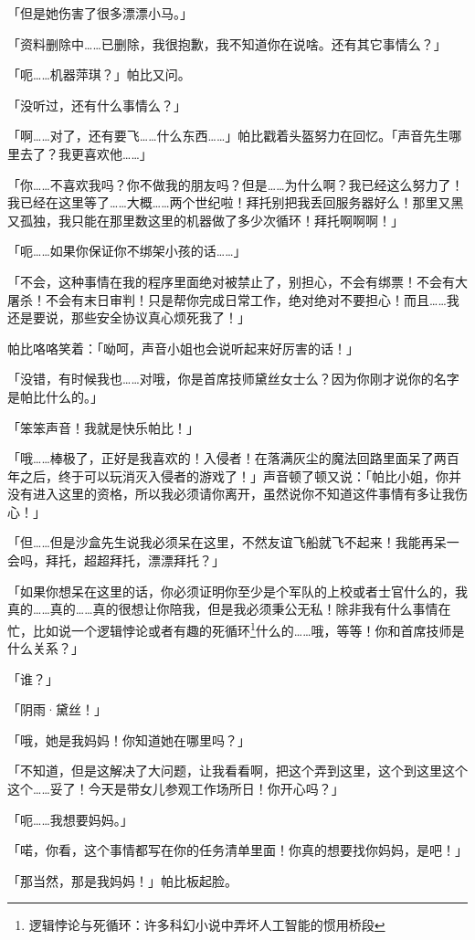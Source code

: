 「但是她伤害了很多漂漂小马。」

「资料删除中……已删除，我很抱歉，我不知道你在说啥。还有其它事情么？」

「呃……机器萍琪？」帕比又问。

「没听过，还有什么事情么？」

「啊……对了，还有要飞……什么东西……」帕比戳着头盔努力在回忆。「声音先生哪里去了？我更喜欢他……」

「你……不喜欢我吗？你不做我的朋友吗？但是……为什么啊？我已经这么努力了！我已经在这里等了……大概……两个世纪啦！拜托别把我丢回服务器好么！那里又黑又孤独，我只能在那里数这里的机器做了多少次循环！拜托啊啊啊！」

「呃……如果你保证你不绑架小孩的话……」

「不会，这种事情在我的程序里面绝对被禁止了，别担心，不会有绑票！不会有大屠杀！不会有末日审判！只是帮你完成日常工作，绝对绝对不要担心！而且……我还是要说，那些安全协议真心烦死我了！」

帕比咯咯笑着：「呦呵，声音小姐也会说听起来好厉害的话！」

「没错，有时候我也……对哦，你是首席技师黛丝女士么？因为你刚才说你的名字是帕比什么的。」

「笨笨声音！我就是快乐帕比！」

「哦……棒极了，正好是我喜欢的！入侵者！在落满灰尘的魔法回路里面呆了两百年之后，终于可以玩消灭入侵者的游戏了！」声音顿了顿又说：「帕比小姐，你并没有进入这里的资格，所以我必须请你离开，虽然说你不知道这件事情有多让我伤心！」

「但……但是沙盒先生说我必须呆在这里，不然友谊飞船就飞不起来！我能再呆一会吗，拜托，超超拜托，漂漂拜托？」

「如果你想呆在这里的话，你必须证明你至少是个军队的上校或者士官什么的，我真的……真的……真的很想让你陪我，但是我必须秉公无私！除非我有什么事情在忙，比如说一个逻辑悖论或者有趣的死循环\footnote{逻辑悖论与死循环：许多科幻小说中弄坏人工智能的惯用桥段}什么的……哦，等等！你和首席技师是什么关系？」

「谁？」

「阴雨·黛丝！」

「哦，她是我妈妈！你知道她在哪里吗？」

「不知道，但是这解决了大问题，让我看看啊，把这个弄到这里，这个到这里这个这个……妥了！今天是带女儿参观工作场所日！你开心吗？」

「呃……我想要妈妈。」

「喏，你看，这个事情都写在你的任务清单里面！你真的想要找你妈妈，是吧！」

「那当然，那是我妈妈！」帕比板起脸。

